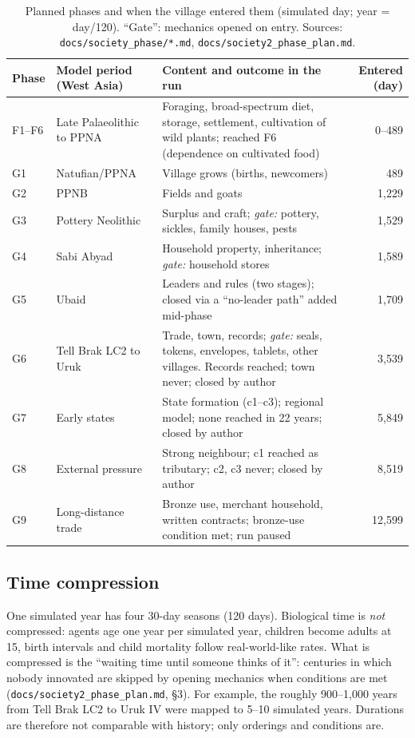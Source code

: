 \documentclass[11pt]{article}
\begin{document}
\begin{table}[t]
\centering\small
\caption{Planned phases and when the village entered them (simulated day; year = day/120). ``Gate'': mechanics opened on entry. Sources: \texttt{docs/society\_phase/*.md}, \texttt{docs/society2\_phase\_plan.md}.}
\label{tab:phases}
\begin{tabularx}{\linewidth}{@{}l l L r@{}}
\toprule
Phase & Model period (West Asia) & Content and outcome in the run & Entered (day) \\
\midrule
F1--F6 & Late Palaeolithic to PPNA & Foraging, broad-spectrum diet, storage, settlement, cultivation of wild plants; reached F6 (dependence on cultivated food) & 0--489 \\
G1 & Natufian/PPNA & Village grows (births, newcomers) & 489 \\
G2 & PPNB & Fields and goats & 1{,}229 \\
G3 & Pottery Neolithic & Surplus and craft; \emph{gate:} pottery, sickles, family houses, pests & 1{,}529 \\
G4 & Sabi Abyad & Household property, inheritance; \emph{gate:} household stores & 1{,}589 \\
G5 & Ubaid & Leaders and rules (two stages); closed via a ``no-leader path'' added mid-phase & 1{,}709 \\
G6 & Tell Brak LC2 to Uruk & Trade, town, records; \emph{gate:} seals, tokens, envelopes, tablets, other villages. Records reached; town never; closed by author & 3{,}539 \\
G7 & Early states & State formation (c1--c3); regional model; none reached in 22 years; closed by author & 5{,}849 \\
G8 & External pressure & Strong neighbour; c1 reached as tributary; c2, c3 never; closed by author & 8{,}519 \\
G9 & Long-distance trade & Bronze use, merchant household, written contracts; bronze-use condition met; run paused & 12{,}599 \\
\bottomrule
\end{tabularx}
\end{table}

\subsection{Time compression}
One simulated year has four 30-day seasons (120 days). Biological time is \emph{not} compressed: agents age one year per simulated year, children become adults at 15, birth intervals and child mortality follow real-world-like rates. What is compressed is the ``waiting time until someone thinks of it'': centuries in which nobody innovated are skipped by opening mechanics when conditions are met (\texttt{docs/society2\_phase\_plan.md}, \S3). For example, the roughly 900--1{,}000 years from Tell Brak LC2 to Uruk IV were mapped to 5--10 simulated years. Durations are therefore not comparable with history; only orderings and conditions are.
\end{document}
